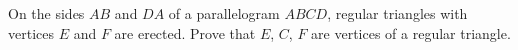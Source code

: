 On the sides $AB$ and $DA$ of a parallelogram $ABCD$, regular triangles with vertices $E$ and $F$ are erected. Prove that $E$, $C$, $F$ are vertices of a regular triangle.
